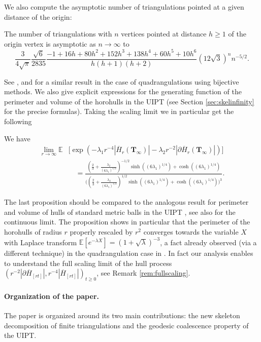 \documentclass[10pt]{amsart}
\theoremstyle{definition}\newtheorem{defi}[theo]{Definition}\newtheorem{rema}[theo]{Remark}\newtheorem{exam}[theo]{Example}\newtheorem{exem}[theo]{Example}\newtheorem{nota}[theo]{Notation}
\begin{document}
We  also compute the asymptotic number of triangulations pointed at a given distance of the origin:
\begin{proposition} \label{prop:UIPTdisth}
The number of triangulations with $n$ vertices pointed at distance $h \geq 1$ of the origin vertex is asymptotic as $n \to \infty$ to
\[ \frac{3}{4 \sqrt \pi} \frac{\sqrt{6}}{2835} \frac{-1+16h+80h^2+152h^3+138h^4+60h^5+10h^6}{h(h+1)(h+2)}
\left( 12\sqrt{3} \right)^{n} n^{-5/2}.
\]
\end{proposition}
See \cite[Equation 4.19]{BDFG03}, \cite[Equation 5.1]{BDFG} and \cite[Lemma 2.5]{CD06} for a similar result in the case of quadrangulations using bijective methods. We also give explicit expressions for the generating function of the perimeter and volume of the horohulls in the UIPT (see Section \ref{sec:skelinfinity} for the precise formulas). Taking the  scaling limit we in particular get the following


\begin{proposition} We have
\begin{align*}
\lim_{r \to \infty}
\mathbb E &\Big[
\exp \left(- \lambda_1 r^{-4}|\overline{H}_{r} (\mathbf{T}_{\infty})| - \lambda_2 r^{-2} |\partial \overline{H}_{r} (\mathbf{T}_{\infty})| \right)\Big]\\
& \quad =
\frac
{
\left(\frac{2}{3} + \frac{\lambda_2}{(6 \lambda_1)^{1/2}} \right)^{-1/2}
\sinh \left( (6 \lambda_1)^{1/4}\right) + \cosh \left( (6 \lambda_1)^{1/4}\right)
}
{\Bigg( \left(\frac{2}{3} + \frac{\lambda_2}{(6 \lambda_1)^{1/2}} \right)^{1/2}
\sinh \left( (6 \lambda_1)^{1/4}\right) + \cosh \left( (6 \lambda_1)^{1/4}\right)\Bigg)^3}.
\end{align*}
\end{proposition}
The last proposition should be compared to the analogous result for perimeter and volume of hulls of standard metric balls in the UIPT \cite{M}, see also \cite{CLG16} for the continuous limit. The proposition shows in particular that the perimeter of the horohulls of radius $r$ properly rescaled by $r^{2}$ converges towards the variable $X$ with Laplace transform $ \mathbb{E}[e^{-\lambda X}] = (1+\sqrt{\lambda})^{-3}$, a fact already observed (via a different technique) in the quadrangulation case in \cite{CMM10}. In fact our analysis enables to understand the full scaling limit of the hull process $( r^{-2}  |\partial \overline{H}_{[rt]}|, r^{-4} | \overline{H}_{[rt]}|)_{t \geq 0}$, see Remark \ref{rem:fullscaling}. \medskip

\paragraph{Organization of the paper.} The paper is organized around its two main contributions: the new skeleton decomposition of finite triangulations and the geodesic coalescence property of the UIPT.
\end{document}
